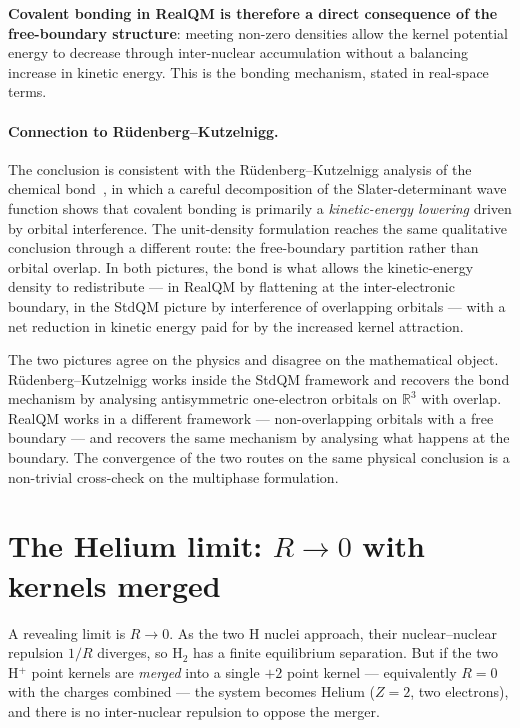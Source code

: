 \textbf{Covalent bonding in RealQM is therefore a direct consequence of the free-boundary structure}: meeting non-zero densities allow the kernel potential energy to decrease through inter-nuclear accumulation without a balancing increase in kinetic energy. This is the bonding mechanism, stated in real-space terms.

\paragraph{Connection to R\"udenberg--Kutzelnigg.}
The conclusion is consistent with the R\"udenberg--Kutzelnigg analysis of the chemical bond~\cite{Ruedenberg62, Kutzelnigg90}, in which a careful decomposition of the Slater-determinant wave function shows that covalent bonding is primarily a \emph{kinetic-energy lowering} driven by orbital interference. The unit-density formulation reaches the same qualitative conclusion through a different route: the free-boundary partition rather than orbital overlap. In both pictures, the bond is what allows the kinetic-energy density to redistribute --- in RealQM by flattening at the inter-electronic boundary, in the StdQM picture by interference of overlapping orbitals --- with a net reduction in kinetic energy paid for by the increased kernel attraction.

The two pictures agree on the physics and disagree on the mathematical object. R\"udenberg--Kutzelnigg works inside the StdQM framework and recovers the bond mechanism by analysing antisymmetric one-electron orbitals on $\mathbb{R}^3$ with overlap. RealQM works in a different framework --- non-overlapping orbitals with a free boundary --- and recovers the same mechanism by analysing what happens at the boundary. The convergence of the two routes on the same physical conclusion is a non-trivial cross-check on the multiphase formulation.

\section{The Helium limit: $R \to 0$ with kernels merged}\label{sec:he-limit}

A revealing limit is $R \to 0$. As the two H nuclei approach, their nuclear--nuclear repulsion $1/R$ diverges, so H$_2$ has a finite equilibrium separation. But if the two H$^+$ point kernels are \emph{merged} into a single $+2$ point kernel --- equivalently $R = 0$ with the charges combined --- the system becomes Helium ($Z = 2$, two electrons), and there is no inter-nuclear repulsion to oppose the merger.

